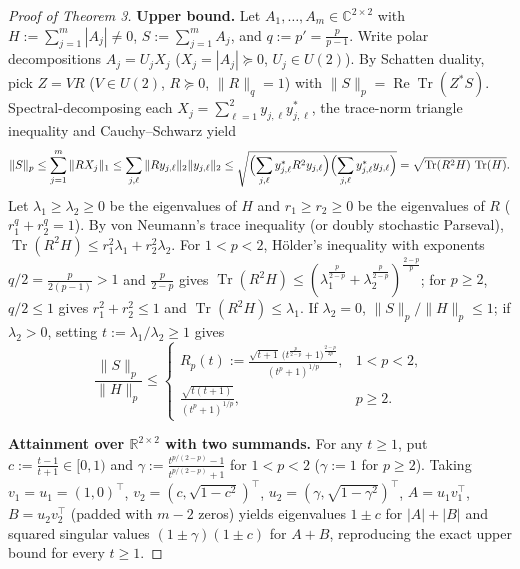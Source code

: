 \documentclass[10pt,letterpaper]{article}
\newcommand{\C}{\mathbb{C}}
\newcommand{\R}{\mathbb{R}}
\newcommand{\Tr}{\operatorname{Tr}}
\begin{document}
\begin{proof}[Proof of Theorem 3]
\textbf{Upper bound.} Let $A_1,\dots,A_m \in \C^{2\times 2}$ with $H := \sum_{j=1}^m |A_j| \neq 0$, $S := \sum_{j=1}^m A_j$, and $q := p' = \frac{p}{p-1}$. Write polar decompositions $A_j = U_j X_j$ ($X_j = |A_j| \succeq 0$, $U_j \in U(2)$). By Schatten duality, pick $Z = V R$ ($V \in U(2)$, $R \succeq 0$, $\|R\|_q = 1$) with $\|S\|_p = \operatorname{Re}\Tr(Z^* S)$. Spectral-decomposing each $X_j = \sum_{\ell=1}^2 y_{j,\ell} y_{j,\ell}^*$, the trace-norm triangle inequality and Cauchy--Schwarz yield
\[
  \|S\|_p \le \sum_{j=1}^m \|R X_j\|_1 \le \sum_{j,\ell} \|R y_{j,\ell}\|_2 \|y_{j,\ell}\|_2
  \le \sqrt{\Bigl(\sum_{j,\ell} y_{j,\ell}^* R^2 y_{j,\ell}\Bigr)\Bigl(\sum_{j,\ell} y_{j,\ell}^* y_{j,\ell}\Bigr)}
  = \sqrt{\Tr(R^2 H)\,\Tr(H)}.
\]
Let $\lambda_1 \ge \lambda_2 \ge 0$ be the eigenvalues of $H$ and $r_1 \ge r_2 \ge 0$ be the eigenvalues of $R$ ($r_1^q + r_2^q = 1$). By von Neumann's trace inequality (or doubly stochastic Parseval), $\Tr(R^2 H) \le r_1^2 \lambda_1 + r_2^2 \lambda_2$. For $1 < p < 2$, H\"older's inequality with exponents $q/2 = \frac{p}{2(p-1)} > 1$ and $\frac{p}{2-p}$ gives $\Tr(R^2 H) \le (\lambda_1^{\frac{p}{2-p}} + \lambda_2^{\frac{p}{2-p}})^{\frac{2-p}{p}}$; for $p \ge 2$, $q/2 \le 1$ gives $r_1^2 + r_2^2 \le 1$ and $\Tr(R^2 H) \le \lambda_1$. If $\lambda_2 = 0$, $\|S\|_p/\|H\|_p \le 1$; if $\lambda_2 > 0$, setting $t := \lambda_1/\lambda_2 \ge 1$ gives
\[
  \frac{\|S\|_p}{\|H\|_p} \le
  \begin{cases}
    \displaystyle R_p(t) := \frac{\sqrt{t+1}\,\bigl(t^{\frac{p}{2-p}} + 1\bigr)^{\frac{2-p}{2p}}}{(t^p + 1)^{1/p}}, & 1 < p < 2,\\[10pt]
    \displaystyle \frac{\sqrt{t(t+1)}}{(t^p + 1)^{1/p}}, & p \ge 2.
  \end{cases}
\]

\textbf{Attainment over $\R^{2\times 2}$ with two summands.} For any $t \ge 1$, put $c := \frac{t-1}{t+1} \in [0,1)$ and $\gamma := \frac{t^{p/(2-p)} - 1}{t^{p/(2-p)} + 1}$ for $1 < p < 2$ ($\gamma := 1$ for $p \ge 2$). Taking $v_1 = u_1 = (1,0)^\top$, $v_2 = (c, \sqrt{1-c^2})^\top$, $u_2 = (\gamma, \sqrt{1-\gamma^2})^\top$, $A = u_1 v_1^\top$, $B = u_2 v_2^\top$ (padded with $m-2$ zeros) yields eigenvalues $1 \pm c$ for $|A|+|B|$ and squared singular values $(1\pm\gamma)(1\pm c)$ for $A+B$, reproducing the exact upper bound for every $t \ge 1$.


\end{proof}
\end{document}
